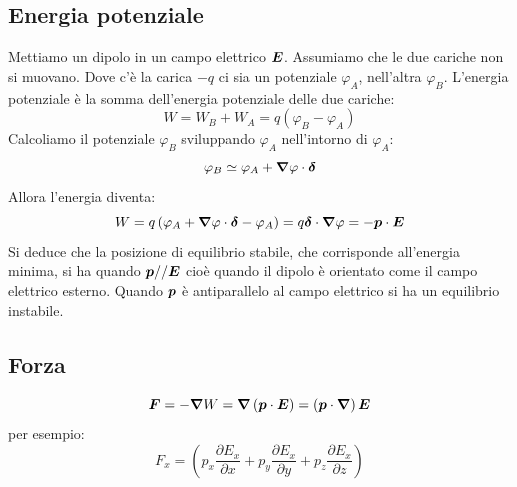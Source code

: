 \subsection{Energia potenziale}
Mettiamo un dipolo in un campo elettrico $\boldsymbol{E}$. Assumiamo che le due cariche non si muovano. Dove c'è la carica $-q$ ci sia un potenziale $\varphi_A$, nell'altra $\varphi_B$. L'energia potenziale è la somma dell'energia potenziale delle due cariche:
\begin{equation*}W=W_B+W_A=q(\varphi_B-\varphi_A)\end{equation*}
Calcoliamo il potenziale $\varphi_B$ sviluppando $\varphi_A$ nell'intorno di $\varphi_A$:
\begin{equation*}\varphi_B\simeq\varphi_A+\boldsymbol{\nabla}\varphi\cdot\boldsymbol{\delta}\end{equation*}
Allora l'energia diventa:
\begin{equation*}W=q\left(\varphi_A+\boldsymbol{\nabla}\varphi\cdot\boldsymbol{\delta}-\varphi_A\right)=q\boldsymbol{\delta}\cdot\boldsymbol{\nabla}\varphi=-\boldsymbol{p}\cdot\boldsymbol{E}\end{equation*}
Si deduce che la posizione di equilibrio stabile, che corrisponde all'energia minima, si ha quando $\boldsymbol{p}//\boldsymbol{E}$ cioè quando il dipolo è orientato come il campo elettrico esterno. Quando $\boldsymbol{p}$ è antiparallelo al campo elettrico si ha un equilibrio instabile.
\subsection{Forza}
\label{forza_dipolo100}
\begin{equation*}\boldsymbol{F}=-\boldsymbol{\nabla} W=\boldsymbol{\nabla}\left(\boldsymbol{p}\cdot\boldsymbol{E}\right)=\left(\boldsymbol{p}\cdot\boldsymbol{\nabla}\right)\boldsymbol{E}\end{equation*}
per esempio:
\begin{equation*}F_x=\left(p_x\frac{\partial E_x}{\partial x}+p_y\frac{\partial E_x}{\partial y}+p_z\frac{\partial E_x}{\partial z}\right)\end{equation*}
